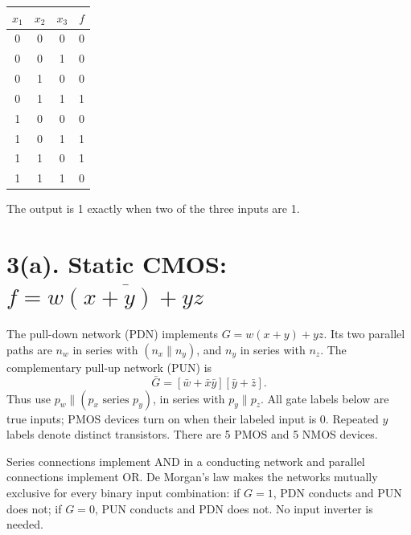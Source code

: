 \documentclass[11pt]{article}
\newcommand{\mos}[4]{\begin{scope}[shift={(#1,#2)}]
\draw (0,.24)--(0,-.24);
\draw (0,.20)--(.25,.20)--(.25,.5);
\draw (0,-.20)--(.25,-.20)--(.25,-.5);
\draw (-.16,.23)--(-.16,-.23);
\ifnum#4=1\draw (-.26,0) circle (.06);\draw (-.75,0)--(-.32,0);\else\draw (-.75,0)--(-.16,0);\fi
\node[anchor=east,font=\small] at (-.76,0) {$#3$};
\end{scope}}
\newcommand{\ground}[2]{\draw (#1,#2)--(#1,{#2-.12});\draw ({#1-.17},{#2-.12})--({#1+.17},{#2-.12});\draw ({#1-.11},{#2-.20})--({#1+.11},{#2-.20});}
\newcommand{\rail}[3]{\draw (#1,#2)--(#1,{#2+.15});\node[above,font=\small] at (#1,{#2+.15}) {$#3$};}
\newcommand{\outputnode}[3]{\fill (#1,#2) circle (.04);\draw (#1,#2)--({#1+.7},#2) node[right] {$#3$};}
\begin{document}
\begin{center}\begin{tabular}{ccc|c} \toprule $x_1$&$x_2$&$x_3$&$f$\\\midrule
0&0&0&0\\0&0&1&0\\0&1&0&0\\0&1&1&1\\1&0&0&0\\1&0&1&1\\1&1&0&1\\1&1&1&0\\\bottomrule
\end{tabular}\end{center}
The output is 1 exactly when two of the three inputs are 1.

\newpage
\section*{3(a). Static CMOS: $f=\overline{w(x+y)+yz}$}
The pull-down network (PDN) implements $G=w(x+y)+yz$. Its two parallel paths are $n_w$ in series with $(n_x\parallel n_y)$, and $n_y$ in series with $n_z$. The complementary pull-up network (PUN) is
\[
 \bar{G}=[\bar{w}+\bar{x}\bar{y}][\bar{y}+\bar{z}].
\]
Thus use $p_w\parallel(p_x\text{ series }p_y)$, in series with $p_y\parallel p_z$. All gate labels below are true inputs; PMOS devices turn on when their labeled input is 0. Repeated $y$ labels denote distinct transistors. There are 5 PMOS and 5 NMOS devices.
\begin{center}\end{center}
Series connections implement AND in a conducting network and parallel connections implement OR. De Morgan's law makes the networks mutually exclusive for every binary input combination: if $G=1$, PDN conducts and PUN does not; if $G=0$, PUN conducts and PDN does not. No input inverter is needed.
\end{document}
